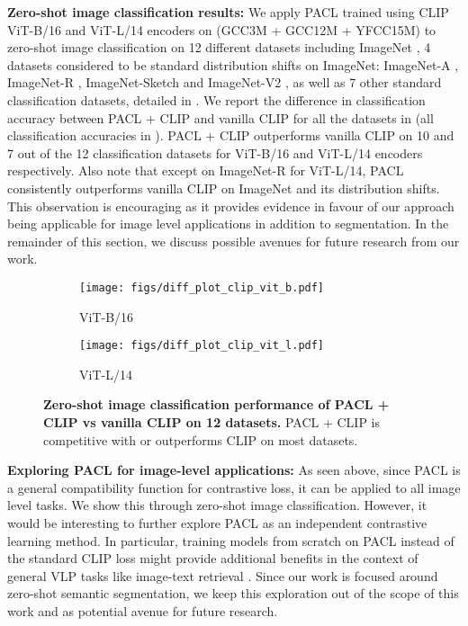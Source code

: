 \documentclass[10pt,twocolumn,letterpaper]{article}
\begin{document}
\textbf{Zero-shot image classification results:} We apply PACL trained using CLIP ViT-B/16 and ViT-L/14 encoders on (GCC3M + GCC12M + YFCC15M) to zero-shot image classification on 12 different datasets including ImageNet \cite{deng2009imagenet}, 4 datasets considered to be standard distribution shifts on ImageNet: ImageNet-A \cite{hendrycks2021natural}, ImageNet-R \cite{hendrycks2021many}, ImageNet-Sketch \cite{wang2019learning} and ImageNet-V2 \cite{recht2019imagenet}, as well as 7 other standard classification datasets, detailed in . We report the difference in classification accuracy between PACL + CLIP and vanilla CLIP for all the datasets in  (all classification accuracies in ). PACL + CLIP outperforms vanilla CLIP on 10 and 7 out of the 12 classification datasets for ViT-B/16 and ViT-L/14 encoders respectively. Also note that except on ImageNet-R for ViT-L/14, PACL consistently outperforms vanilla CLIP on ImageNet and its distribution shifts. This observation is encouraging as it provides evidence in favour of our approach being applicable for image level applications in addition to segmentation. In the remainder of this section, we discuss possible avenues for future research from our work.

\begin{figure}[!t]
\centering
    \begin{subfigure}{0.48\linewidth}
        \centering
        \texttt{[image: figs/diff\_plot\_clip\_vit\_b.pdf]}
        \caption{ViT-B/16}
        \label{subfig:diff_plot_vit_b}
\end{subfigure}
    \begin{subfigure}{0.48\linewidth}
        \centering
        \texttt{[image: figs/diff\_plot\_clip\_vit\_l.pdf]}
        \caption{ViT-L/14}
        \label{subfig:diff_plot_vit_l}
\end{subfigure}
    \vspace{-2mm}
    \caption{\textbf{Zero-shot image classification performance of PACL + CLIP vs vanilla CLIP on 12 datasets.} PACL + CLIP is competitive with or outperforms CLIP on most datasets.}
    \vspace{-5mm}
    \label{fig:diff_plot_classification}
\end{figure}

\textbf{Exploring PACL for image-level applications:} As seen above, since PACL is a general compatibility function for contrastive loss, it can be applied to all image level tasks. We show this through zero-shot image classification. However, it would be interesting to further explore PACL as an independent contrastive learning method. In particular, training models from scratch on PACL instead of the standard CLIP loss might provide additional benefits in the context of general VLP tasks like image-text retrieval \cite{wang2016comprehensive}. Since our work is focused around zero-shot semantic segmentation, we keep this exploration out of the scope of this work and as potential avenue for future research.
\end{document}
